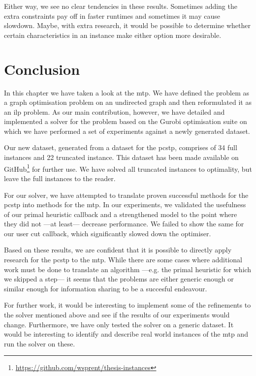 Either way, we see no clear tendencies in these results. Sometimes adding the extra constraints
pay off in faster runtimes and sometimes it may cause slowdown. Maybe, with extra research, it
would be possible to determine whether certain characteristics in an instance make either option
more desirable.

\section{Conclusion}
In this chapter we have taken a look at the \acrlong{mtp}. We have defined the problem as
a graph optimisation problem on an undirected graph and then reformulated it as an \gls{ilp}
problem. As our main contribution, however, we have detailed and implemented a solver for the
problem based on the Gurobi optimisation suite on which we have performed a set of experiments
against a newly generated dataset.

Our new dataset, generated from a dataset for the \gls{pcstp}, comprises of 34 full instances
and 22 truncated instance. This dataset
has been made available on
GitHub\footnote{\url{https://github.com/wsprent/thesis-instances}}
for further use. We have solved all truncated instances to
optimality, but leave the full instances to the reader.

For our solver, we have attempted to translate proven successful methods for the \gls{pcstp}
into methods for
the \gls{mtp}.
In our experiments, we validated the usefulness of our primal heuristic callback and
a strengthened model to the point where they did not
---at least---
decrease performance.
We failed to show the same for our user cut callback, which significantly slowed down the
optimiser.

Based on these results, we are confident that it is possible to directly apply research for
the \gls{pcstp} to the \gls{mtp}. While there are some cases where additional work must be
done to translate an algorithm ---e.g. the primal heuristic for which we skipped a step---
it seems that the problems are either generic enough or similar enough for information sharing
to be a succesful endeavour.

For further work, it would be interesting to implement some of the refinements to the solver
mentioned above and see if the results of our experiments would change. Furthermore, we have
only tested the solver on a generic dataset. It would be interesting to identify and describe
real world instances of the \gls{mtp} and run the solver on these.


